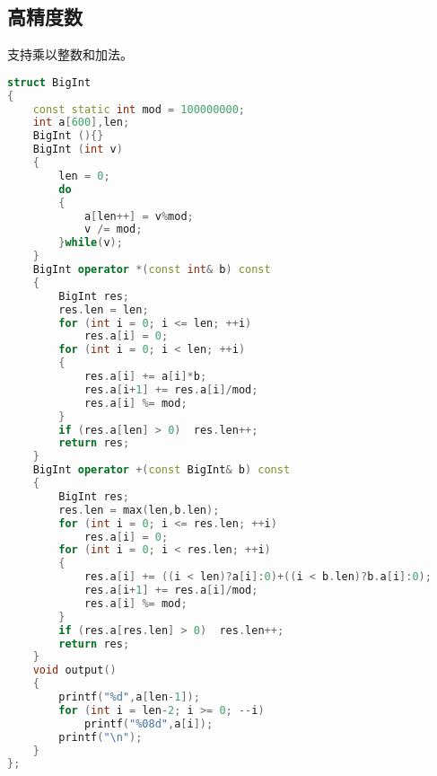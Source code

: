 \subsection{高精度数}
    支持乘以整数和加法。\\
    \begin{lstlisting}[language=c++]
struct BigInt
{
    const static int mod = 100000000;
    int a[600],len;
    BigInt (){}
    BigInt (int v)
    {
        len = 0;
        do
        {
            a[len++] = v%mod;
            v /= mod;
        }while(v);
    }
    BigInt operator *(const int& b) const
    {
        BigInt res;
        res.len = len;
        for (int i = 0; i <= len; ++i)
            res.a[i] = 0;
        for (int i = 0; i < len; ++i)
        {
            res.a[i] += a[i]*b;
            res.a[i+1] += res.a[i]/mod;
            res.a[i] %= mod;
        }
        if (res.a[len] > 0)  res.len++;
        return res;
    }
    BigInt operator +(const BigInt& b) const
    {
        BigInt res;
        res.len = max(len,b.len);
        for (int i = 0; i <= res.len; ++i)
            res.a[i] = 0;
        for (int i = 0; i < res.len; ++i)
        {
            res.a[i] += ((i < len)?a[i]:0)+((i < b.len)?b.a[i]:0);
            res.a[i+1] += res.a[i]/mod;
            res.a[i] %= mod;
        }
        if (res.a[res.len] > 0)  res.len++;
        return res;
    }
    void output()
    {
        printf("%d",a[len-1]);
        for (int i = len-2; i >= 0; --i)
            printf("%08d",a[i]);
        printf("\n");
    }
};
    \end{lstlisting} 